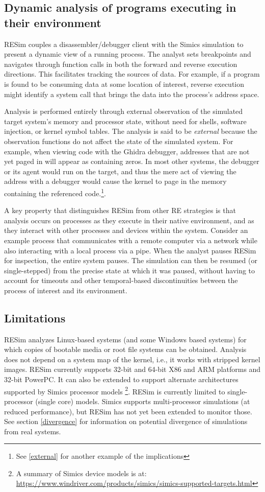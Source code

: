 \documentclass[titlepage]{article}
\begin{document}
\subsection{Dynamic analysis of programs executing in their environment}
RESim couples a disassembler/debugger client with the Simics simulation to present a dynamic view of a running process.  The analyst sets breakpoints and navigates through function calls in both the forward and reverse execution directions.  This facilitates tracking the sources of data.  For example, if a program is found to be consuming data at some location of interest, reverse execution might identify a system call that brings the data into the process’s address space.

Analysis is performed entirely through external observation of the simulated target system's memory and processor state, 
without need for shells, software injection, or kernel symbol tables.   The analysis is said to be \textit{external} because the observation functions do
not affect the state of the simulated system.  For example, when viewing code with the Ghidra debugger, addresses that are not yet paged in will appear as containing zeros.
In most other systems, the debugger or its agent would run on the target, and thus the mere act of viewing the address with a debugger 
would cause the kernel to page
in the memory containing the referenced code.\footnote{See \ref{external} for another example of the implications}.

A key property that distinguishes RESim from other RE strategies is that analysis occurs on processes as they execute in their native environment, and as they interact with other processes and devices within the system.  Consider an example process that communicates with a remote computer via a network while also interacting with a local process via a pipe.  When the analyst pauses RESim for inspection, the entire system pauses.  The simulation can then be resumed (or single-stepped) from the precise state at which it was paused, without having to account for timeouts and other temporal-based discontinuities between the process of interest and its environment.

\subsection{Limitations}
RESim analyzes Linux-based systems (and some Windows based systems) for which copies of bootable media or root file systems can be obtained.  Analysis does not depend on a system map of the kernel, i.e., it works with stripped kernel images.  RESim currently supports 32-bit and 64-bit X86 and ARM platforms and 32-bit PowerPC.  It can also be 
extended to support alternate architectures supported by Simics processor models \footnote{A summary of Simics device models is at: \url{https://www.windriver.com/products/simics/simics-supported-targets.html}}.  RESim is currently limited to single-processor (single core) models.  Simics supports
multi-processor simulations (at reduced performance), but RESim has not yet been extended to monitor those.
See section \ref{divergence} for information on potential divergence of simulations from real systems.
\end{document}
